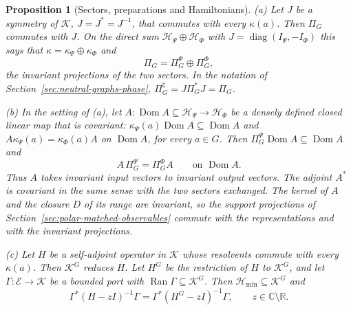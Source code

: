 \documentclass[11pt]{article}
\newtheorem{proposition}{Proposition}[section]
\theoremstyle{definition}
\DeclareMathOperator{\Ran}{Ran}
\newcommand{\C}{\mathbb C}
\newcommand{\R}{\mathbb R}
\newcommand{\Hmin}{\mathcal H_{\min}}
\begin{document}
\begin{proposition}[Sectors, preparations and Hamiltonians]
\label{prop:symmetry-compatibility}
\textup{(a)} Let $J$ be a symmetry of $\mathcal K$, $J=J^*=J^{-1}$, that commutes with every $\kappa(a)$. Then $\Pi_G$ commutes with $J$. On the direct sum $\mathcal H_\Psi\oplus\mathcal H_\Phi$ with $J=\operatorname{diag}(I_\Psi,-I_\Phi)$ this says that $\kappa=\kappa_\Psi\oplus\kappa_\Phi$ and
\begin{equation}
 \Pi_G=\Pi_G^\Psi\oplus\Pi_G^\Phi ,
 \label{eq:symmetry-sector-sum}
\end{equation}
the invariant projections of the two sectors. In the notation of Section~\ref{sec:neutral-graphs-phase}, $\Pi_G^\sharp=J\Pi_G^*J=\Pi_G$.

\textup{(b)} In the setting of \textup{(a)}, let $A:\operatorname{Dom}A\subseteq\mathcal H_\Psi\to\mathcal H_\Phi$ be a densely defined closed linear map that is covariant: $\kappa_\Psi(a)\operatorname{Dom}A\subseteq\operatorname{Dom}A$ and $A\kappa_\Psi(a)=\kappa_\Phi(a)A$ on $\operatorname{Dom}A$, for every $a\in G$. Then $\Pi_G^\Psi\operatorname{Dom}A\subseteq\operatorname{Dom}A$ and
\begin{equation}
 A\,\Pi_G^\Psi=\Pi_G^\Phi A\qquad\text{on }\operatorname{Dom}A .
 \label{eq:symmetry-covariant-map}
\end{equation}
Thus $A$ takes invariant input vectors to invariant output vectors. The adjoint $A^*$ is covariant in the same sense with the two sectors exchanged. The kernel of $A$ and the closure $D$ of its range are invariant, so the support projections of Section~\ref{sec:polar-matched-observables} commute with the representations and with the invariant projections.

\textup{(c)} Let $H$ be a self-adjoint operator in $\mathcal K$ whose resolvents commute with every $\kappa(a)$. Then $\mathcal K^G$ reduces $H$. Let $H^G$ be the restriction of $H$ to $\mathcal K^G$, and let $\Gamma:\mathcal E\to\mathcal K$ be a bounded port with $\Ran\Gamma\subseteq\mathcal K^G$. Then $\Hmin\subseteq\mathcal K^G$ and
\begin{equation}
 \Gamma^*(H-zI)^{-1}\Gamma=\Gamma^*(H^G-zI)^{-1}\Gamma ,\qquad z\in\C\setminus\R .
 \label{eq:symmetry-compressed-response}
\end{equation}
\end{proposition}
\end{document}
